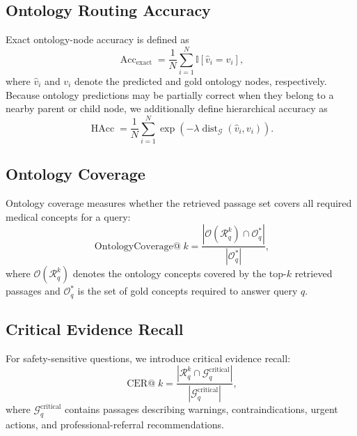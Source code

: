 \documentclass{article}
\begin{document}
\subsection{Ontology Routing Accuracy}

Exact ontology-node accuracy is defined as
\begin{equation}
    \operatorname{Acc}_{\mathrm{exact}}
    =
    \frac{1}{N}
    \sum_{i=1}^{N}
    \mathbb{I}
    \left[
    \hat{v}_i = v_i
    \right],
\end{equation}
where $\hat{v}_i$ and $v_i$ denote the predicted and gold ontology nodes, respectively.
Because ontology predictions may be partially correct when they belong to a 
nearby parent or child node, we additionally define hierarchical accuracy as
\begin{equation}
    \operatorname{HAcc}
    =
    \frac{1}{N}
    \sum_{i=1}^{N}
    \exp
    \left(
    -\lambda
    \operatorname{dist}_{\mathcal{G}}
    (\hat{v}_i,v_i)
    \right).
\end{equation}

\subsection{Ontology Coverage}
Ontology coverage measures whether the retrieved passage set covers all required medical concepts for a query:
\begin{equation}
    \operatorname{OntologyCoverage@}k
    =
    \frac{
    |\mathcal{O}(\mathcal{R}_q^{k}) \cap \mathcal{O}_q^{*}|
    }{
    |\mathcal{O}_q^{*}|
    },
\end{equation}
where $\mathcal{O}(\mathcal{R}_q^{k})$ denotes the ontology concepts covered by the top-$k$ retrieved passages and $\mathcal{O}_q^{*}$ is the set of gold concepts required to answer query $q$.

\subsection{Critical Evidence Recall}
For safety-sensitive questions, we introduce critical evidence recall:
\begin{equation}
    \operatorname{CER@}k
    =
    \frac{
    |\mathcal{R}_q^{k} \cap \mathcal{G}_q^{\mathrm{critical}}|
    }{
    |\mathcal{G}_q^{\mathrm{critical}}|
    },
\end{equation}
where $\mathcal{G}_q^{\mathrm{critical}}$ contains passages describing warnings, contraindications, urgent actions, and professional-referral recommendations.
\end{document}
